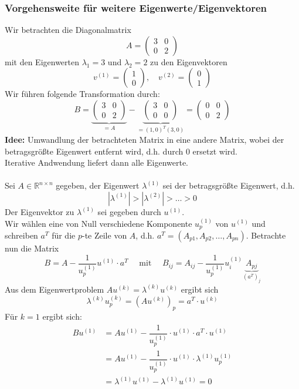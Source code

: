 \subsubsection{Vorgehensweite für weitere Eigenwerte/Eigenvektoren}
Wir betrachten die Diagonalmatrix
\[A = \begin{pmatrix}
    3 & 0 \\ 0 & 2
\end{pmatrix}\]
mit den Eigenwerten $\lambda_1=3$ und $\lambda_2=2$ zu den Eigenvektoren
\[v^{(1)}=\begin{pmatrix}
    1 \\ 0
\end{pmatrix}, \quad v^{(2)}= \begin{pmatrix}
    0 \\ 1
\end{pmatrix}\]
Wir führen folgende Transformation durch:
\[B = \underbrace{\begin{pmatrix}
    3 & 0 \\ 0 & 2
\end{pmatrix}}_{=A} - \underbrace{\begin{pmatrix}
    3 & 0 \\ 0 & 0
\end{pmatrix}}_{=(1,0)^T(3,0)} = \begin{pmatrix}
    0 & 0 \\ 0 & 2
\end{pmatrix}\]
\textbf{Idee:} Umwandlung der betrachteten Matrix in eine andere Matrix, wobei der betragsgrößte Eigenwert entfernt
wird, d.h. durch $0$ ersetzt wird. \\
Iterative Andwendung liefert dann alle Eigenwerte. \\ \\
Sei $A\in\mathbb{R}^{n\times n}$ gegeben, der Eigenwert $\lambda^{(1)}$ sei der betragsgrößte Eigenwert, d.h.
\[|\lambda^{(1)}| > |\lambda^{(2)}| > \dotsc > 0\]
Der Eigenvektor zu $\lambda^{(1)}$ sei gegeben durch $u^{(1)}$. \\
Wir wählen eine von Null verschiedene Komponente $u^{(1)}_p$ von $u^{(1)}$ und schreiben $a^T$ für die $p$-te Zeile
von $A$, d.h. $a^T=(A_{p1},A_{p2},\dotsc,A_{pn})$. Betrachte nun die Matrix 
\[B = A - \dfrac{1}{u_p^{(1)}} u^{(1)}\cdot a^T\quad\text{ mit }\quad B_{ij} = 
A_{ij}-\dfrac{1}{u^{(1)}_p}u^{(1)}_i\underbrace{A_{pj}}_{(a^T)_j}\]
Aus dem Eigenwertproblem $Au^{(k)} = \lambda^{(k)}u^{(k)}$ ergibt sich
\[\lambda^{(k)}u^{(k)}_p = (Au^{(k)})_p = a^T\cdot u^{(k)}\]
Für $k=1$ ergibt sich:
\begin{align*}
    Bu^{(1)} &= Au^{(1)} - \dfrac{1}{u^{(1)}_p} \cdot u^{(1)}\cdot a^T\cdot u^{(1)} \\
    &=Au^{(1)} - \dfrac{1}{u^{(1)}_p} \cdot u^{(1)}\cdot \lambda^{(1)}u^{(1)}_p \\
    &= \lambda^{(1)}u^{(1)} - \lambda^{(1)}u^{(1)} = 0
\end{align*}
